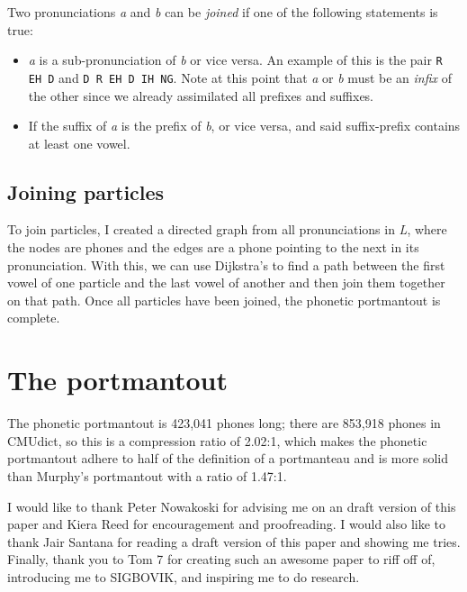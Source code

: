 \documentclass[sn-mathphys,Numbered]{sn-jnl}%
\theoremstyle{thmstyleone}%
\theoremstyle{thmstyletwo}%
\theoremstyle{thmstylethree}%
\begin{document}
Two pronunciations \textit{a} and \textit{b} can be \textit{joined} if one of the following statements is true:
\begin{itemize}
    \item \textit{a} is a sub-pronunciation of \textit{b} or vice versa. An example of this is the pair \verb|R EH D| and \verb|D R EH D IH NG|. Note at this point that \textit{a} or \textit{b} must be an \textit{infix} of the other since we already assimilated all prefixes and suffixes.
    \item If the suffix of \textit{a} is the prefix of \textit{b}, or vice versa, and said suffix-prefix contains at least one vowel.
\end{itemize}

\subsection{Joining particles}\label{subsec3}

To join particles, I created a directed graph from all pronunciations in \textit{L}, where the nodes are phones and the edges are a phone pointing to the next in its pronunciation. With this, we can use Dijkstra's to find a path between the first vowel of one particle and the last vowel of another and then join them together on that path. Once all particles have been joined, the phonetic portmantout is complete.

\section{The portmantout}\label{sec4}

The phonetic portmantout is 423,041 phones long; there are 853,918 phones in CMUdict, so this is a compression ratio of 2.02:1, which makes the phonetic portmantout adhere to half of the definition of a portmanteau and is more solid than Murphy's portmantout with a ratio of 1.47:1.

 I would like to thank Peter Nowakoski for advising me on an draft version of this paper and Kiera Reed for encouragement and proofreading. I would also like to thank Jair Santana for reading a draft version of this paper and showing me tries. Finally, thank you to Tom 7 for creating such an awesome paper to riff off of, introducing me to SIGBOVIK, and inspiring me to do research.
\end{document}
